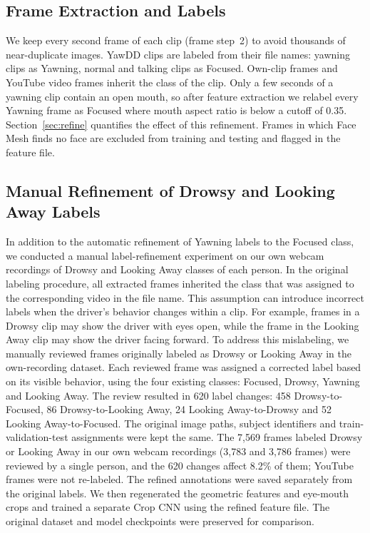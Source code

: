 \documentclass[conference]{IEEEtran}
\begin{document}
\subsection{Frame Extraction and Labels}\label{sec:labels}
We keep every second frame of each clip (frame step~2) to avoid thousands of near-duplicate images. YawDD clips are labeled from their file names: yawning clips as Yawning, normal and talking clips as Focused. Own-clip frames and YouTube video frames inherit the class of the clip. Only a few seconds of a yawning clip contain an open mouth, so after feature extraction we relabel every Yawning frame as Focused where mouth aspect ratio is below a cutoff of 0.35. Section~\ref{sec:refine} quantifies the effect of this refinement. Frames in which Face Mesh finds no face are excluded from training and testing and flagged in the feature file.

\subsection{Manual Refinement of Drowsy and Looking Away Labels}\label{sec:manualref}
In addition to the automatic refinement of Yawning labels to the Focused class, we conducted a manual label-refinement experiment on our own webcam recordings of Drowsy and Looking Away classes of each person. In the original labeling procedure, all extracted frames inherited the class that was assigned to the corresponding video in the file name. This assumption can introduce incorrect labels when the driver's behavior changes within a clip. For example, frames in a Drowsy clip may show the driver with eyes open, while the frame in the Looking Away clip may show the driver facing forward.
\newline To address this mislabeling, we manually reviewed frames originally labeled as Drowsy or Looking Away in the own-recording dataset. Each reviewed frame was assigned a corrected label based on its visible behavior, using the four existing classes: Focused, Drowsy, Yawning and Looking Away. The review resulted in 620 label changes: 458 Drowsy-to-Focused, 86 Drowsy-to-Looking Away, 24 Looking Away-to-Drowsy and 52 Looking Away-to-Focused. The original image paths, subject identifiers and train-validation-test assignments were kept the same. The 7,569 frames labeled Drowsy or Looking Away in our own webcam recordings (3,783 and 3,786 frames) were reviewed by a single person, and the 620 changes affect 8.2\% of them; YouTube frames were not re-labeled.
\newline The refined annotations were saved separately from the original labels. We then regenerated the geometric features and eye-mouth crops and trained a separate Crop CNN using the refined feature file. The original dataset and model checkpoints were preserved for comparison.
\end{document}
